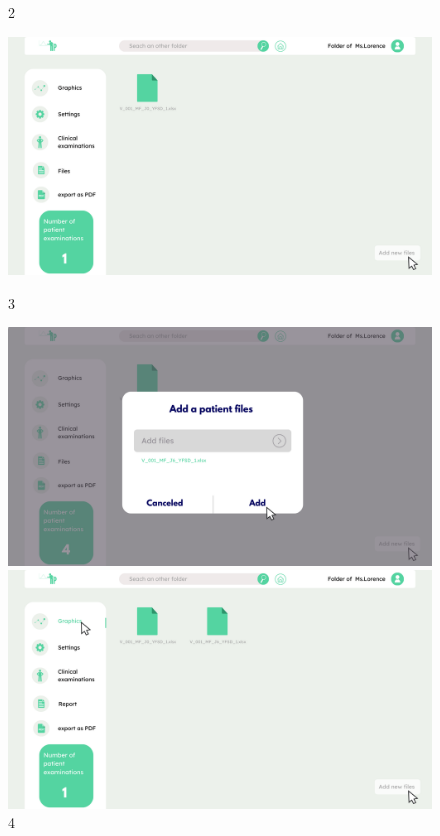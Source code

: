 \begin{figure}[H]
\begin{minipage}{0.3\textwidth}
        \caption*{2}
    \end{minipage}
    \begin{minipage}{0.3\textwidth}
        \centering
        \includegraphics[width=\textwidth]{images/Prototype/3.png}
        \caption*{3}
    \end{minipage}
    \begin{minipage}{0.3\textwidth}
        \centering
        \includegraphics[width=\textwidth]{images/Prototype/4.png}
        \caption*{4}
    \end{minipage}
    \begin{minipage}{0.3\textwidth}
        \centering
        \includegraphics[width=\textwidth]{images/Prototype/5.png}

\end{minipage}
\end{figure}

